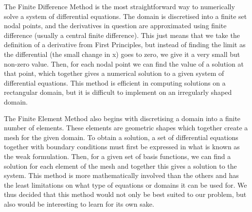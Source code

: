 \documentclass{article}
\begin{document}
The Finite Difference Method is the most straightforward way to numerically solve a system of differential equations. The domain is discretised into a finite set nodal points, and the derivatives in question are approximated using finite difference (usually a central finite difference). This just means that we take the definition of a derivative from First Principles, but instead of finding the limit as the differential (the small change in x) goes to zero, we give it a very small but non-zero value. Then, for each nodal point we can find the value of a solution at that point, which together gives a numerical solution to a given system of differential equations. This method is efficient in computing solutions on a rectangular domain, but it is difficult to implement on an irregularly shaped domain.

The Finite Element Method also begins with discretising a domain into a finite number of elements. These elements are geometric shapes which together create a mesh for the given domain. To obtain a solution, a set of differential equations together with boundary conditions must first be expressed in what is known as the weak formulation. Then, for a given set of basis functions, we can find a solution for each element of the mesh and together this gives a solution to the system. This method is more mathematically involved than the others and has the least limitations on what type of equations or domains it can be used for. We thus decided that this method would not only be best suited to our problem, but also would be interesting to learn for its own sake.
\end{document}
